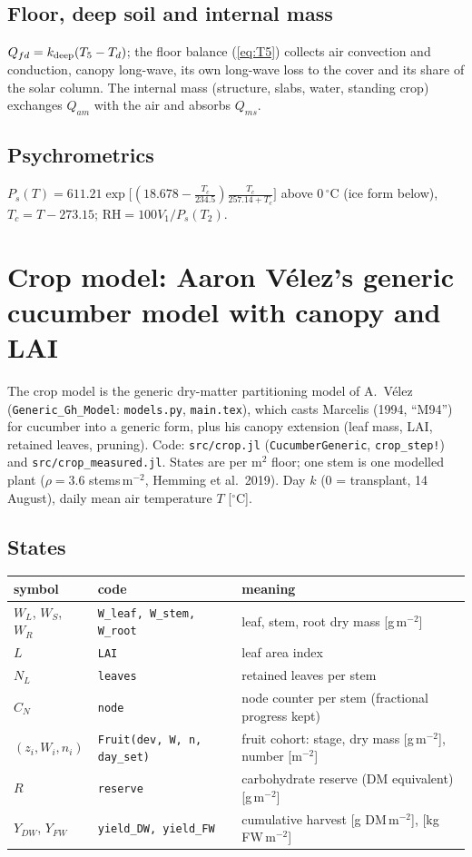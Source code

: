 \documentclass[11pt,a4paper]{article}
\newcommand{\code}[1]{\texttt{#1}}
\begin{document}
\subsection{Floor, deep soil and internal mass}
$Q_{fd}=k_{\rm deep}(T_5-T_d)$; the floor balance (\ref{eq:T5}) collects air convection and conduction, canopy long-wave,
its own long-wave loss to the cover and its share of the solar column. The internal mass (structure, slabs, water, standing
crop) exchanges $Q_{am}$ with the air and absorbs $Q_{ms}$.

\subsection{Psychrometrics}
$P_s(T)=611.21\exp\bigl[(18.678-\frac{T_c}{234.5})\frac{T_c}{257.14+T_c}\bigr]$ above 0\,$^\circ$C (ice form below),
$T_c=T-273.15$; $\mathrm{RH}=100V_1/P_s(T_2)$.

\section{Crop model: Aaron V\'elez's generic cucumber model with canopy and LAI}\label{sec:crop}
The crop model is the generic dry-matter partitioning model of A.~V\'elez (\code{Generic\_Gh\_Model}: \code{models.py},
\code{main.tex}), which casts Marcelis (1994, ``M94'') for cucumber into a generic form, plus his canopy extension
(leaf mass, LAI, retained leaves, pruning). Code: \code{src/crop.jl} (\code{CucumberGeneric}, \code{crop\_step!}) and
\code{src/crop\_measured.jl}. States are per m$^2$ floor; one stem is one modelled plant ($\rho=3.6$ stems\,m$^{-2}$,
Hemming et al.\ 2019). Day $k$ (0 = transplant, 14 August), daily mean air temperature $T$ [$^\circ$C].

\subsection{States}
\begin{center}\small
\begin{tabular}{lll}\toprule
symbol & code & meaning\\\midrule
$W_L$, $W_S$, $W_R$ & \code{W\_leaf, W\_stem, W\_root} & leaf, stem, root dry mass [g\,m$^{-2}$]\\
$L$ & \code{LAI} & leaf area index\\
$N_L$ & \code{leaves} & retained leaves per stem\\
$C_N$ & \code{node} & node counter per stem (fractional progress kept)\\
$(z_i,W_i,n_i)$ & \code{Fruit(dev, W, n, day\_set)} & fruit cohort: stage, dry mass [g\,m$^{-2}$], number [m$^{-2}$]\\
$R$ & \code{reserve} & carbohydrate reserve (DM equivalent) [g\,m$^{-2}$]\\
$Y_{DW}$, $Y_{FW}$ & \code{yield\_DW, yield\_FW} & cumulative harvest [g DM\,m$^{-2}$], [kg FW\,m$^{-2}$]\\
\bottomrule\end{tabular}
\end{center}
\end{document}
